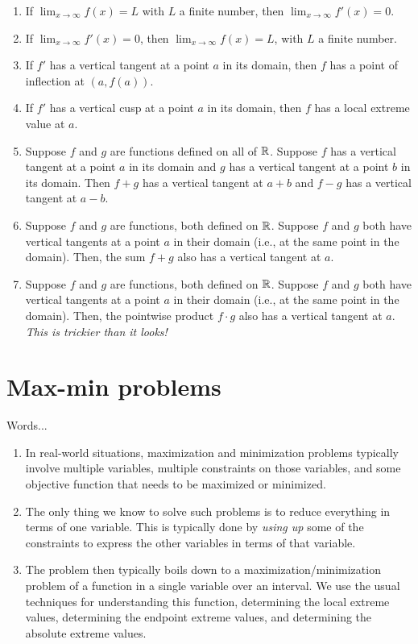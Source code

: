 \documentclass[10pt]{amsart}
\begin{document}
\begin{enumerate}
\item If $\lim_{x \to \infty} f(x) = L$ with $L$ a finite number, then
  $\lim_{x \to \infty} f'(x) = 0$.
\item If $\lim_{x \to \infty} f'(x) = 0$, then $\lim_{x \to \infty}
  f(x) = L$, with $L$ a finite number.
\item If $f'$ has a vertical tangent at a point $a$ in its domain,
  then $f$ has a point of inflection at $(a,f(a))$.
\item If $f'$ has a vertical cusp at a point $a$ in its domain, then
  $f$ has a local extreme value at $a$.
\item Suppose $f$ and $g$ are functions defined on all of
  $\mathbb{R}$. Suppose $f$ has a vertical tangent at a point $a$ in its
  domain and $g$ has a vertical tangent at a point $b$ in its
  domain. Then $f + g$ has a vertical tangent at $a + b$ and $f - g$
  has a vertical tangent at $a - b$.
\item Suppose $f$ and $g$ are functions, both defined on $\mathbb{R}$. Suppose
  $f$ and $g$ both have vertical tangents at a point $a$ in their
  domain (i.e., at the same point in the domain). Then, the sum $f +
  g$ also has a vertical tangent at $a$.
\item Suppose $f$ and $g$ are functions, both defined on $\mathbb{R}$. Suppose
  $f$ and $g$ both have vertical tangents at a point $a$ in their domain (i.e.,
  at the same point in the domain). Then, the pointwise product $f
  \cdot g$ also has a vertical tangent at $a$. {\em This is trickier
  than it looks!}
\end{enumerate}
\section{Max-min problems}

Words...

\begin{enumerate}
\item In real-world situations, maximization and minimization problems
  typically involve multiple variables, multiple constraints on those
  variables, and some objective function that needs to be maximized or
  minimized.
\item The only thing we know to solve such problems is to reduce
  everything in terms of one variable. This is typically done by {\em
  using up} some of the constraints to express the other variables in
  terms of that variable.
\item The problem then typically boils down to a
  maximization/minimization problem of a function in a single variable
  over an interval. We use the usual techniques for understanding this
  function, determining the local extreme values, determining the
  endpoint extreme values, and determining the absolute extreme
  values.
\end{enumerate}
\end{document}
